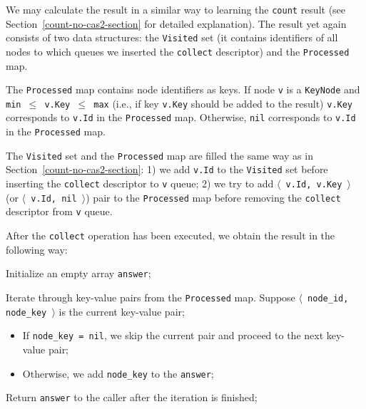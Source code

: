 \documentclass[times, dvipsnames,%
               languages={russian,english} %
              ]{itmo-student-thesis}
\begin{document}
\bigbreak

We may calculate the result in a similar way to learning the \texttt{count} result (see Section~\ref{count-no-cas2-section} for detailed explanation). The result yet again consists of two data structures: the \texttt{Visited} set (it contains identifiers of all nodes to which queues we inserted the \texttt{collect} descriptor) and the \texttt{Processed} map. 

The \texttt{Processed} map contains node identifiers as keys. If node \texttt{v} is a \texttt{KeyNode} and \texttt{min $\leq$ v.Key $\leq$ max} (i.e., if key \texttt{v.Key} should be added to the result) \texttt{v.Key} corresponds to \texttt{v.Id} in the \texttt{Processed} map. Otherwise, \texttt{nil} corresponds to \texttt{v.Id} in the \texttt{Processed} map. 

The \texttt{Visited} set and the \texttt{Processed} map are filled the same way as in Section~\ref{count-no-cas2-section}: 1) we add \texttt{v.Id} to the \texttt{Visited} set before inserting the \texttt{collect} descriptor to \texttt{v} queue; 2) we try to add \texttt{$\langle$ v.Id, v.Key $\rangle$} (or \texttt{$\langle$ v.Id, nil $\rangle$}) pair to the \texttt{Processed} map before removing the \texttt{collect} descriptor from \texttt{v} queue.

After the \texttt{collect} operation has been executed, we obtain the result in the following way: 

\begin{nenum}
    \item Initialize an empty array \texttt{answer};

    \item Iterate through key-value pairs from the \texttt{Processed} map. Suppose \newline \texttt{$\langle$ node\_id, node\_key $\rangle$} is the current key-value pair;
    
    \begin{itemize}
        \item If \texttt{node\_key = nil}, we skip the current pair and proceed to the next key-value pair;
    
        \item Otherwise, we add \texttt{node\_key} to the \texttt{answer};
    \end{itemize}
    
    \item Return \texttt{answer} to the caller after the iteration is finished;
\end{nenum}
\end{document}
